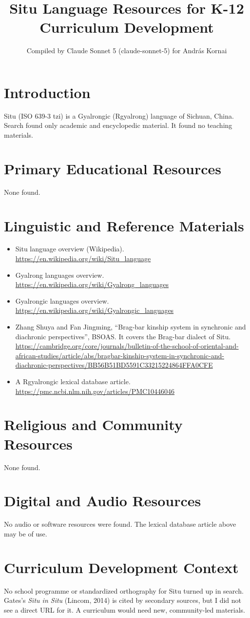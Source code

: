 \documentclass[12pt]{article}
\title{Situ Language Resources for K-12 Curriculum Development}
\author{Compiled by Claude Sonnet 5 (claude-sonnet-5) for Andr\'as Kornai}
\date{}
\begin{document}
\maketitle
\section{Introduction}
Situ (ISO 639-3 tzi) is a Gyalrongic (Rgyalrong) language of Sichuan, China. Search found only academic and encyclopedic material. It found no teaching materials.
\section{Primary Educational Resources}
None found.
\section{Linguistic and Reference Materials}
\begin{itemize}
\item Situ language overview (Wikipedia). \url{https://en.wikipedia.org/wiki/Situ_language}
\item Gyalrong languages overview. \url{https://en.wikipedia.org/wiki/Gyalrong_languages}
\item Gyalrongic languages overview. \url{https://en.wikipedia.org/wiki/Gyalrongic_languages}
\item Zhang Shuya and Fan Jingming, ``Brag-bar kinship system in synchronic and diachronic perspectives'', BSOAS. It covers the Brag-bar dialect of Situ. \url{https://cambridge.org/core/journals/bulletin-of-the-school-of-oriental-and-african-studies/article/abs/bragbar-kinship-system-in-synchronic-and-diachronic-perspectives/BB56B51BD5591C33215224864FFA0CFE}
\item A Rgyalrongic lexical database article. \url{https://pmc.ncbi.nlm.nih.gov/articles/PMC10446046}
\end{itemize}
\section{Religious and Community Resources}
None found.
\section{Digital and Audio Resources}
No audio or software resources were found. The lexical database article above may be of use.
\section{Curriculum Development Context}
No school programme or standardized orthography for Situ turned up in search. Gates's \emph{Situ in Situ} (Lincom, 2014) is cited by secondary sources, but I did not see a direct URL for it. A curriculum would need new, community-led materials.
\end{document}
